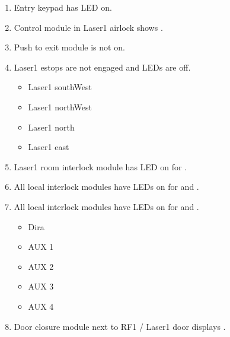 \documentclass[letterpaper,10pt,english]{sphinxmanual}
\begin{document}
\begin{enumerate}
\item {} 
\sphinxAtStartPar
Entry keypad has  LED on.

\item {} 
\sphinxAtStartPar
Control module in Laser\sphinxhyphen{}1 airlock shows .

\item {} 
\sphinxAtStartPar
Push to exit module is not on.

\item {} 
\sphinxAtStartPar
Laser\sphinxhyphen{}1 \sphinxhyphen{}estops are not engaged and LEDs are off.
\begin{itemize}
\item {} 
\sphinxAtStartPar
Laser\sphinxhyphen{}1 south\sphinxhyphen{}West

\item {} 
\sphinxAtStartPar
Laser\sphinxhyphen{}1 north\sphinxhyphen{}West

\item {} 
\sphinxAtStartPar
Laser\sphinxhyphen{}1 north

\item {} 
\sphinxAtStartPar
Laser\sphinxhyphen{}1 east

\end{itemize}

\item {} 
\sphinxAtStartPar
Laser\sphinxhyphen{}1 room interlock module has LED on for .

\item {} 
\sphinxAtStartPar
All local interlock modules have LEDs on for  and .

\item {} 
\sphinxAtStartPar
All local interlock modules have LEDs on for  and .
\begin{itemize}
\item {} 
\sphinxAtStartPar
Dira

\item {} 
\sphinxAtStartPar
AUX 1

\item {} 
\sphinxAtStartPar
AUX 2

\item {} 
\sphinxAtStartPar
AUX 3

\item {} 
\sphinxAtStartPar
AUX 4

\end{itemize}

\item {} 
\sphinxAtStartPar
Door closure module next to RF\sphinxhyphen{}1 / Laser\sphinxhyphen{}1 door displays .

\end{enumerate}
\end{document}

